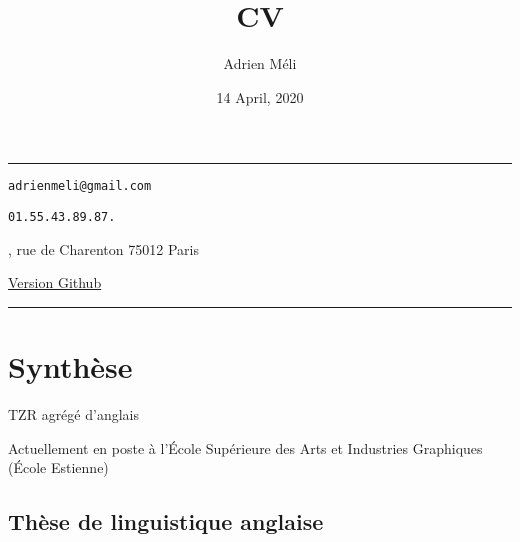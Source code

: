 \documentclass[
  10pt,
]{article}
\title{CV}
\author{Adrien Méli}
\date{14 April, 2020}
\begin{document}
\maketitle

{
\setcounter{tocdepth}{1}
\tableofcontents
}
\begin{center}\rule{0.5\linewidth}{0.5pt}\end{center}

\quad \faEnvira \quad \texttt{adrienmeli@gmail.com}

\quad \faPhone \quad \texttt{01.55.43.89.87.}

\quad \faEnvelope {}, rue de Charenton 75012 Paris

\href{https://adrienmeli.github.io/cv/}{\quad \faGithub \quad Version Github}

\begin{center}\rule{0.5\linewidth}{0.5pt}\end{center}

\pagebreak

\hypertarget{synthuxe8se}{%
\section{Synthèse}\label{synthuxe8se}}

TZR agrégé d'anglais

Actuellement en poste à l'École Supérieure des Arts et Industries Graphiques (École Estienne)

\hypertarget{thuxe8se-de-linguistique-anglaise}{%
\subsection{Thèse de linguistique anglaise}\label{thuxe8se-de-linguistique-anglaise}}
\end{document}
